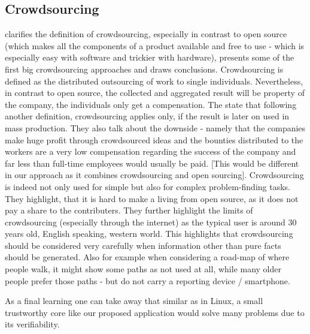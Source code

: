 \subsection{Crowdsourcing}
\parencite{brabham2008crowdsourcing} clarifies the definition of crowdsourcing, especially in contrast to open source (which makes all the components of a product available and free to use - which is especially easy with software and trickier with hardware), presents some of the first big crowdsourcing approaches and draws conclusions. Crowdsourcing is defined as the distributed outsourcing of work to single individuals. Nevertheless, in contrast to open source, the collected and aggregated result will be property of the company, the individuals only get a compensation. The state that following another definition, crowdsourcing applies only, if the result is later on used in mass production. They also talk about the downside - namely that the companies make huge profit through crowdsourced ideas and the bounties distributed to the workers are a very low compensation regarding the success of the company and far less than full-time employees would usually be paid. [This would be different in our approach as it combines crowdsourcing and open sourcing]. Crowdsourcing is indeed not only used for simple but also for complex problem-finding tasks. They highlight, that it is hard to make a living from open source, as it does not pay a share to the contributers. They further highlight the limits of crowdsourcing (especially through the internet) as the typical user is around 30 years old, English speaking, western world. This highlights that crowdsourcing should be considered very carefully when information other than pure facts should be generated. Also for example when considering a road-map of where people walk, it might show some paths as not used at all, while many older people prefer those paths - but do not carry a reporting device / smartphone.


As a final learning one can take away that similar as in Linux, a small trustworthy core like our proposed application would solve many problems due to its verifiability. 
